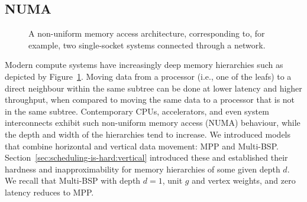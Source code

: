 \documentclass[oneside,reqno, a4paper]{amsart}
\numberwithin{equation}{section}
\begin{document}
\subsection{NUMA}
\label{sec:avoiding-hardness:numa}

\begin{figure}
	\centering
	\resizebox{.4\textwidth}{!}{}
	\caption{A non-uniform memory access architecture, corresponding to, for example, two single-socket systems connected through a network.}
	\label{fig:numa}
\end{figure}

Modern compute systems have increasingly deep memory hierarchies such as depicted by Figure~\ref{fig:numa}.
Moving data from a processor (i.e., one of the leafs) to a direct neighbour within the same subtree can be done at lower latency and higher throughput,
when compared to moving the same data to a processor that is not in the same subtree.
Contemporary CPUs, accelerators, and even system interconnects exhibit such non-uniform memory access (NUMA) behaviour,
while the depth and width of the hierarchies tend to increase.
We introduced models that combine horizontal and vertical data movement:
MPP and Multi-BSP.
Section~\ref{sec:scheduling-is-hard:vertical} introduced these and established their hardness and inapproximability for memory hierarchies of some given depth $d$.
We recall that Multi-BSP with depth $d=1$, unit $g$ and vertex weights, and zero latency reduces to MPP.
\end{document}
